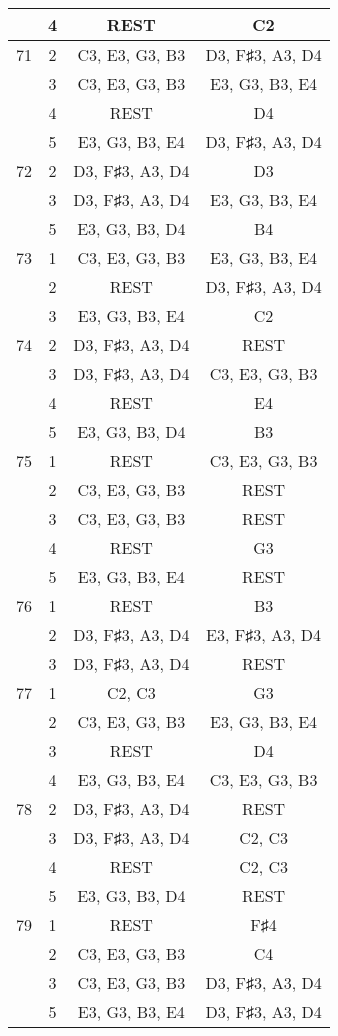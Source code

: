 \documentclass{article}
\begin{document}
\begin{longtable}{|c|c|c|c|}
  & 4 & REST & C2 \\ 
\hline
71 & 2 & C3, E3, G3, B3 & D3, F♯3, A3, D4 \\ 
  & 3 & C3, E3, G3, B3 & E3, G3, B3, E4 \\ 
  & 4 & REST & D4 \\ 
  & 5 & E3, G3, B3, E4 & D3, F♯3, A3, D4 \\ 
\hline
72 & 2 & D3, F♯3, A3, D4 & D3 \\ 
  & 3 & D3, F♯3, A3, D4 & E3, G3, B3, E4 \\ 
  & 5 & E3, G3, B3, D4 & B4 \\ 
\hline
73 & 1 & C3, E3, G3, B3 & E3, G3, B3, E4 \\ 
  & 2 & REST & D3, F♯3, A3, D4 \\ 
  & 3 & E3, G3, B3, E4 & C2 \\ 
\hline
74 & 2 & D3, F♯3, A3, D4 & REST \\ 
  & 3 & D3, F♯3, A3, D4 & C3, E3, G3, B3 \\ 
  & 4 & REST & E4 \\ 
  & 5 & E3, G3, B3, D4 & B3 \\ 
\hline
75 & 1 & REST & C3, E3, G3, B3 \\ 
  & 2 & C3, E3, G3, B3 & REST \\ 
  & 3 & C3, E3, G3, B3 & REST \\ 
  & 4 & REST & G3 \\ 
  & 5 & E3, G3, B3, E4 & REST \\ 
\hline
76 & 1 & REST & B3 \\ 
  & 2 & D3, F♯3, A3, D4 & E3, F♯3, A3, D4 \\ 
  & 3 & D3, F♯3, A3, D4 & REST \\ 
\hline
77 & 1 & C2, C3 & G3 \\ 
  & 2 & C3, E3, G3, B3 & E3, G3, B3, E4 \\ 
  & 3 & REST & D4 \\ 
  & 4 & E3, G3, B3, E4 & C3, E3, G3, B3 \\ 
\hline
78 & 2 & D3, F♯3, A3, D4 & REST \\ 
  & 3 & D3, F♯3, A3, D4 & C2, C3 \\ 
  & 4 & REST & C2, C3 \\ 
  & 5 & E3, G3, B3, D4 & REST \\ 
\hline
79 & 1 & REST & F♯4 \\ 
  & 2 & C3, E3, G3, B3 & C4 \\ 
  & 3 & C3, E3, G3, B3 & D3, F♯3, A3, D4 \\ 
  & 5 & E3, G3, B3, E4 & D3, F♯3, A3, D4 \\ 

\end{longtable}
\end{document}
